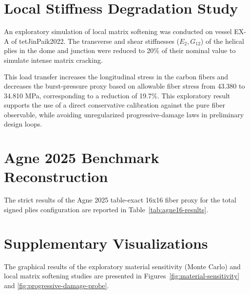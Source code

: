 \documentclass[10pt,twocolumn]{article}
\begin{document}
\section{Local Stiffness Degradation Study}

An exploratory simulation of local matrix softening was conducted on vessel EX-A of 	tet{JinPaik2022}. The transverse and shear stiffnesses ($E_2, G_{12}$) of the helical plies in the dome and junction were reduced to 20\% of their nominal value to simulate intense matrix cracking.

This load transfer increases the longitudinal stress in the carbon fibers and decreases the burst-pressure proxy based on allowable fiber stress from 43.380 to 34.810 MPa, corresponding to a reduction of 19.7\%. This exploratory result supports the use of a direct conservative calibration against the pure fiber observable, while avoiding unregularized progressive-damage laws in preliminary design loops.

\section{Agne 2025 Benchmark Reconstruction}

The strict results of the Agne 2025 table-exact 16x16 fiber proxy for the total signed plies configuration are reported in Table~\ref{tab:agne16-results}.

\begin{table}[h]
  \centering
  \caption{Strict results of the Agne 2025 table-exact 16x16 fiber proxy. Here $p_f$ is the pressure inferred from the maximum fiber stress ratio. The table should not be read as a final experimental validation because the shell model remains linear elastic and the layer counting convention is unresolved.}
  \label{tab:agne16-results}
  \resizebox{\textwidth}{!}{}
\end{table}

\section{Supplementary Visualizations}

The graphical results of the exploratory material sensitivity (Monte Carlo) and local matrix softening studies are presented in Figures~\ref{fig:material-sensitivity} and \ref{fig:progressive-damage-probe}.
\end{document}
